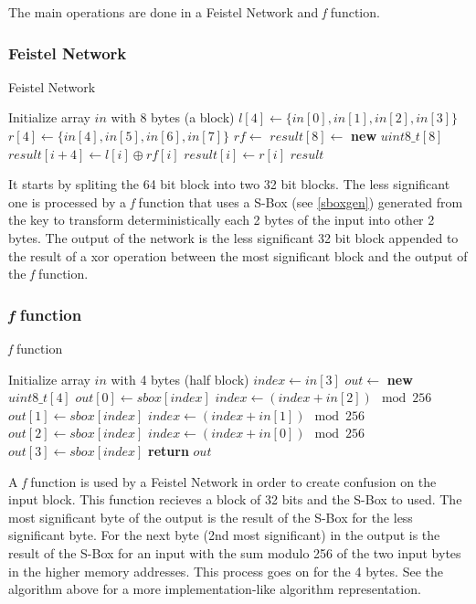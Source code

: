 \documentclass{article} %
\begin{document}
The main operations are done in a Feistel Network and \textit{f} function.

\subsubsection{Feistel Network}

\begin{algorithm}[H]
  \caption{Feistel Network}
  \begin{algorithmic}[1]
  \State Initialize array $in$ with 8 bytes (a block)
  \State $l[4] \gets \{in[0], in[1], in[2], in[3]\}$
  \State $r[4] \gets \{in[4], in[5], in[6], in[7]\}$
  \State $rf \gets$ 
  \State $result[8] \gets$ \textbf{new} $uint8\_t[8]$
    \State $result[i + 4] \gets l[i] \oplus rf[i]$
    \State $result[i] \gets r[i]$
  \EndFor
  \State \Return $result$
  \end{algorithmic}
\end{algorithm}

It starts by spliting the 64 bit block into two 32 bit blocks.
The less significant one is processed by a \textit{f} function that uses a S-Box (see \autoref{sboxgen}) 
generated from the key to transform deterministically each 2 bytes of the input into other 2 bytes.
The output of the network is the less significant 32 bit block appended to the result of a xor operation between 
the most significant block and the output of the \textit{f} function.

\subsubsection{\textit{f} function}

\begin{algorithm}[H]
  \caption{\textit{f} function}
\begin{algorithmic}[1]
  \State Initialize array $in$ with 4 bytes (half block)
  \State $index \gets in[3]$
  \State $out \gets$ \textbf{new} $uint8\_t[4]$
  \State $out[0] \gets sbox[index]$
  \State $index \gets (index + in[2]) \mod 256$
  \State $out[1] \gets sbox[index]$
  \State $index \gets (index + in[1]) \mod 256$
  \State $out[2] \gets sbox[index]$
  \State $index \gets (index + in[0]) \mod 256$
  \State $out[3] \gets sbox[index]$
  \State \textbf{return} $out$
\end{algorithmic}
\end{algorithm}

A \textit{f} function is used by a Feistel Network in order to create confusion on the input block.
This function recieves a block of 32 bits and the S-Box to used. The most significant byte of the output is 
the result of the S-Box for the less significant byte. For the next byte (2nd most significant) in the 
output is the result of the S-Box for an input with the sum modulo 256 of the two input bytes in the higher memory addresses.
This process goes on for the 4 bytes. See the algorithm above for a more implementation-like algorithm representation.
\end{document}

